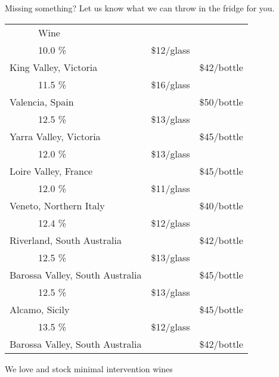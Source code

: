 \documentclass[12pt]{article}
\makeatletter
\newcommand*\ColText[1]{\textcolor{SpringGreen4}{#1}}
\newcommand*\GroupGlassTitle[2]{%
  \noalign{\vspace{2em}}
  \fontfamily{qzc}\selectfont #2 & \vspace{1em}\fontsize{20}{29}\selectfont\ColText{#1}}
\newenvironment{Group}
  {\vspace{2em}\noindent\begin{tabular*}{\textwidth}{@{} p{10mm} l@{\extracolsep{\fill}} r@{\hspace{1em}} r@{}}} %
  {\end{tabular*}}
\newcommand*\Booze[3]{%
  \noalign{\vspace{1em}}
  \multicolumn{2}{l}{ #1 \tiny\dotfill } & \scriptsize #2 \% \tiny\dotfill & \normalsize \$#3}
\newcommand*\Wine[5]{%
  \noalign{\vspace{0.5em}}
  \Booze{#1}{#3}{#4\tiny/glass} \\
  \multicolumn{2}{l}{ \hspace*{0.1em} \scriptsize #2 } & {} & \normalsize \$#5\tiny/bottle}
\newcommand*\Glass[2]{%
    \begin{tikzpicture}[remember picture,overlay]
        \node[xshift=5mm,yshift=0mm]{%
            \texttt{[image: Glasses/\#1.png]}
        };
    \end{tikzpicture}%
}
\newcommand*\GlassWine{%
    \Glass{wine}{4.5mm}}
\makeatother
\begin{document}
\vfill
\begin{center}
	Missing something? Let us know what we can throw in the fridge for you.
\end{center}
\pagebreak
\begin{Group}
    \GroupGlassTitle{Wine}{\GlassWine} \\
    \Wine{Puncheon Darts \textbf{Prosecco}}{King Valley, Victoria}{10.0}{12}{42} \\
    \Wine{Tharsys Cava Brut Nature}{Valencia, Spain}{11.5}{16}{50} \\
    \Wine{Lighthand \textbf{Chardonnay}}{Yarra Valley, Victoria}{12.5}{13}{45} \\
    \Wine{Guy Allion \textbf{Sauvignon Blanc}}{Loire Valley, France}{12.0}{13}{45} \\
    \Wine{Paladino \textbf{Pinot Grigio}}{Veneto, Northern Italy}{12.0}{11}{40} \\
    \Wine{Continental Platter Delirium \textbf{Orange}}{Riverland, South Australia}{12.4}{12}{42} \\
    \Wine{Quin Everyday Explorer Mataro \textbf{Rosé}}{Barossa Valley, South Australia}{12.5}{13}{45} \\
    \Wine{Ciello Rossa \textbf{Nero d'Avalo}}{Alcamo, Sicily}{12.5}{13}{45} \\
    \Wine{Continental Platter \textbf{Shiraz}}{Barossa Valley, South Australia}{13.5}{12}{42} \\
\end{Group}
\vfill
\begin{center}
	We love and stock minimal intervention wines
\end{center}
\pagebreak
\end{document}
